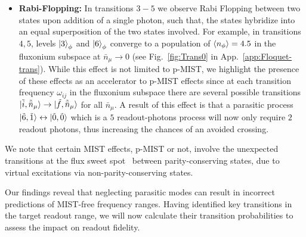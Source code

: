 \documentclass[%
reprint,
superscriptaddress,
 amsmath,amssymb,
 aps,
 prx,
longbibliography,
floatfix,
]{revtex4-2}
\begin{document}
\begin{itemize}
\item \textbf{Rabi-Flopping:} In transitions $3-5$ we observe Rabi Flopping between two states upon addition of a single photon, such that, the states hybridize into an equal superposition of the two states involved. For example, in transitions $4,5$, levels $\ket{3}_\phi$ and $\ket{6}_\phi$ converge to a population of $\braket{n_\phi}=4.5$ in the fluxonium subspace at $\bar n_\mu\rightarrow 0$ (see Fig.~\ref{fig:Trans0} in App.~\ref{app:Floquet-trans}). While this effect is not limited to p-MIST, we highlight the presence of these effects as an accelerator to p-MIST effects since at each transition frequency $\omega_{ij}$ in the fluxonium subspace there are several possible transitions $\ket{\tilde{i},\tilde{\bar n}_\mu}\rightarrow \ket{\tilde{f},\tilde{\bar n}_\mu}$ for all $\bar n_\mu$. A result of this effect is that a parasitic process $\ket{\tilde{6},\tilde{1}}\leftrightarrow\ket{\tilde{0},\tilde{0}}$ which is a $5$ readout-photons process will now only require $2$ readout photons, thus increasing the chances of an avoided crossing.


\end{itemize}
We note that certain MIST effects, p-MIST or not, involve the unexpected transitions at the flux sweet spot~\cite{zhu_circuit_2013} between parity-conserving states, due to virtual excitations via non-parity-conserving states. 

Our findings reveal that neglecting parasitic modes can result in incorrect predictions of MIST-free frequency ranges. Having identified key transitions in the target readout range, we will now calculate their transition probabilities to assess the impact on readout fidelity.
\end{document}
